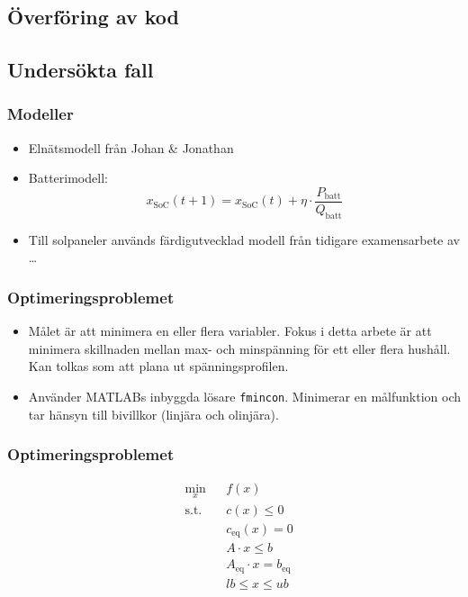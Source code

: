 \documentclass[noamsthm, swedish]{beamer}
\begin{document}
\subsection{Överföring av kod}
\subsection{Undersökta fall}
% 
\begin{frame}
\frametitle{Modeller}
    \begin{itemize}
        \item Elnätsmodell från Johan \& Jonathan
        
        \item Batterimodell: 
            $$x_\mathrm{SoC}(t+1) = x_\mathrm{SoC}(t) + \eta \cdot \frac{P_\mathrm{batt}}{Q_\mathrm{batt}}$$
        \item Till solpaneler används färdigutvecklad modell från tidigare examensarbete av \dots
    \end{itemize}
\end{frame}

\begin{frame}
\frametitle{Optimeringsproblemet}
\begin{itemize}
    \item Målet är att minimera en eller flera variabler. Fokus i detta arbete är att minimera skillnaden mellan max- och minspänning för ett eller flera hushåll. Kan tolkas som att plana ut spänningsprofilen.

    \item Använder MATLABs inbyggda lösare \texttt{fmincon}. Minimerar en målfunktion och tar hänsyn till bivillkor (linjära och olinjära).
\end{itemize}
\end{frame}

\begin{frame}
\frametitle{Optimeringsproblemet}

\begin{equation*}
    \begin{aligned}
        & \underset{x}{\text{min}}
        & & f(x) \\
        & \text{s.t.}
        & & c(x) \leq 0 \\
        & & & c_\text{eq}(x) = 0 \\
        & & & A \cdot x \leq b \\
        & & & A_\text{eq} \cdot x = b_\text{eq} \\
        & & & lb \leq x \leq ub
    \end{aligned}
\end{equation*}

    
\end{frame}
\end{document}
